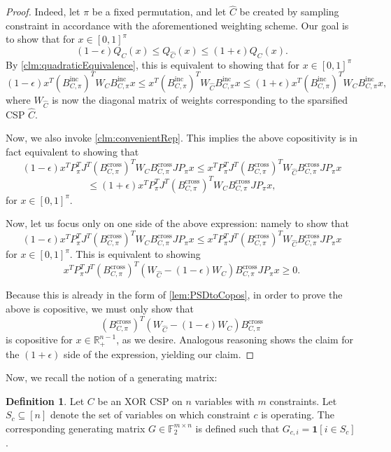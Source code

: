 \documentclass[11pt]{article}
\theoremstyle{definition}
\newtheorem{definition}{Definition}[section]
\newcommand{\F}{\mathbb{F}}
\newcommand{\R}{\mathbb{R}}
\newcommand{\eps}{\epsilon}
\begin{document}
\begin{proof}
Indeed, let $\pi$ be a fixed permutation, and let $\hat{C}$ be created by sampling constraint in accordance with the aforementioned weighting scheme. Our goal is to show that for $x \in [0,1]^{\pi}$
\[
(1 - \eps)Q_C(x) \leq Q_{\hat{C}}(x) \leq (1 + \eps)Q_C(x).
\]
By \cref{clm:quadraticEquivalence}, this is equivalent to showing that for $x \in [0,1]^{\pi}$
\[
(1 - \eps) x^T (B^{\text{inc}}_{C, \pi})^T W_C B^{\text{inc}}_{C, \pi} x  \leq x^T (B^{\text{inc}}_{C, \pi})^T W_{\hat{C}} B^{\text{inc}}_{C, \pi} x \leq (1 + \eps) x^T (B^{\text{inc}}_{C, \pi})^T W_C B^{\text{inc}}_{C, \pi} x,
\]
where $W_{\hat{C}} $ is now the diagonal matrix of weights corresponding to the sparsified CSP $\hat{C}$.

Now, we also invoke \cref{clm:convenientRep}. This implies the above copositivity is in fact equivalent to showing that 
\[
(1 - \eps) x^T P_{\pi}^{T} J^T (B^{\text{cross}}_{C, \pi})^T W_C B^{\text{cross}}_{C, \pi} J P_{\pi} x  \leq x^T P_{\pi}^{T} J^T (B^{\text{cross}}_{C, \pi})^T W_{\hat{C}} B^{\text{cross}}_{C, \pi} J P_{\pi} x 
\]
\[
\leq (1 + \eps) x^T P_{\pi}^{T} J^T (B^{\text{cross}}_{C, \pi})^T W_C B^{\text{cross}}_{C, \pi} J P_{\pi} x,
\]
for $x \in [0,1]^{\pi}$.

Now, let us focus only on one side of the above expression: namely to show that \[
(1 - \eps) x^T P_{\pi}^{T} J^T (B^{\text{cross}}_{C, \pi})^T W_C B^{\text{cross}}_{C, \pi} J P_{\pi} x  \leq x^T P_{\pi}^{T} J^T (B^{\text{cross}}_{C, \pi})^T W_{\hat{C}} B^{\text{cross}}_{C, \pi} J P_{\pi} x
\]for $x \in [0,1]^{\pi}$. This is equivalent to showing 
\[
x^T P_{\pi}^{T} J^T (B^{\text{cross}}_{C, \pi})^T (W_{\hat{C}} - (1 - \eps)W_C) B^{\text{cross}}_{C, \pi} J P_{\pi} x \geq 0.
\]

Because this is already in the form of \cref{lem:PSDtoCopos}, in order to prove the above is copositive, we must only show that 
\[
(B^{\text{cross}}_{C, \pi})^T (W_{\hat{C}} - (1 - \eps)W_C) B^{\text{cross}}_{C, \pi}
\]
is copositive for $x \in \R^{n-1}_+$, as we desire. Analogous reasoning shows the claim for the $(1 + \eps)$ side of the expression, yielding our claim. 
\end{proof}

Now, we recall the notion of a generating matrix:

\begin{definition}\label{def:genMatrixXOR}
    Let $C$ be an XOR CSP on $n$ variables with $m$ constraints. Let $S_c \subseteq [n]$ denote the set of variables on which constraint $c$ is operating. The corresponding generating matrix $G \in \F_2^{m \times n}$ is defined such that $G_{c, i} = \mathbf{1}[i \in S_c]$.
\end{definition}
\end{document}
